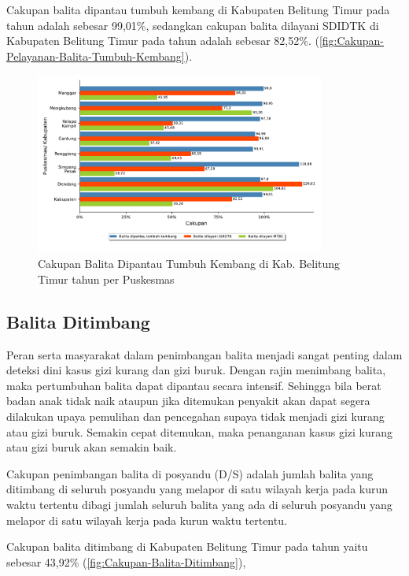 Cakupan balita dipantau tumbuh kembang di Kabupaten Belitung Timur pada tahun \tP adalah sebesar 99,01\%, sedangkan cakupan balita dilayani SDIDTK di Kabupaten Belitung Timur pada tahun \tP adalah sebesar 82,52\%. (\autoref{fig:Cakupan-Pelayanan-Balita-Tumbuh-Kembang}).

\begin{figure}[H]
	\centering
	\includegraphics[width=0.85\textwidth]{bab_05/bab_05_23_balitaTumbuhKembang}
	\caption{Cakupan Balita Dipantau Tumbuh Kembang di Kab. Belitung Timur tahun \tP per Puskesmas}
	\label{fig:Cakupan-Pelayanan-Balita-Tumbuh-Kembang}
\end{figure}

\subsection{Balita Ditimbang}
\label{subsec:Balita-Ditimbang}
Peran serta masyarakat dalam penimbangan balita menjadi sangat penting
dalam deteksi dini kasus gizi kurang dan gizi buruk. Dengan rajin
menimbang balita, maka pertumbuhan balita dapat dipantau secara intensif.
Sehingga bila berat badan anak tidak naik ataupun jika ditemukan penyakit
akan dapat segera dilakukan upaya pemulihan dan pencegahan supaya
tidak menjadi gizi kurang atau gizi buruk. Semakin cepat ditemukan,
maka penanganan kasus gizi kurang atau gizi buruk akan semakin baik.\par

Cakupan penimbangan balita di posyandu (D/S) adalah jumlah balita
yang ditimbang di seluruh posyandu yang melapor di satu wilayah kerja
pada kurun waktu tertentu dibagi jumlah seluruh balita yang ada di
seluruh posyandu yang melapor di satu wilayah kerja pada kurun waktu
tertentu.

Cakupan balita ditimbang di Kabupaten Belitung Timur pada tahun \tP yaitu sebesar 43,92\% (\autoref{fig:Cakupan-Balita-Ditimbang}), %

